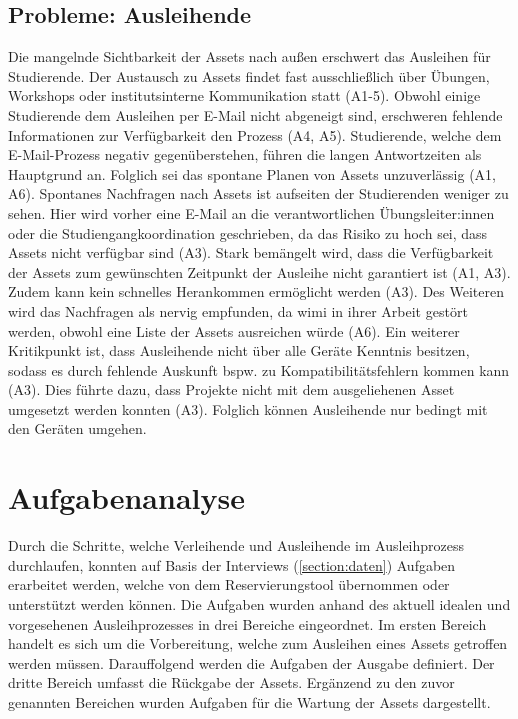 \subsection{Probleme: Ausleihende}
\label{section:probleme-Ausleihende}
Die mangelnde Sichtbarkeit der Assets nach außen erschwert das Ausleihen für
Studierende. Der Austausch zu Assets findet fast ausschließlich über Übungen,
Workshops oder institutsinterne Kommunikation statt (A1-5). Obwohl einige
Studierende dem Ausleihen per E-Mail nicht abgeneigt sind, erschweren fehlende
Informationen zur Verfügbarkeit den Prozess (A4, A5). Studierende, welche dem
E-Mail-Prozess negativ gegenüberstehen, führen die langen Antwortzeiten als
Hauptgrund an. Folglich sei das spontane Planen von Assets unzuverlässig (A1,
A6). Spontanes Nachfragen nach Assets ist aufseiten der Studierenden weniger zu
sehen. Hier wird vorher eine E-Mail an die verantwortlichen Übungsleiter:innen
oder die Studiengangkoordination geschrieben, da das Risiko zu hoch sei, dass
Assets nicht verfügbar sind (A3). Stark bemängelt wird, dass die Verfügbarkeit
der Assets zum gewünschten Zeitpunkt der Ausleihe nicht garantiert ist (A1, A3).
Zudem kann kein schnelles Herankommen ermöglicht werden (A3). Des Weiteren wird
das Nachfragen als nervig empfunden, da \ac{wimi} in ihrer Arbeit gestört
werden, obwohl eine Liste der Assets ausreichen würde (A6). Ein weiterer
Kritikpunkt ist, dass Ausleihende nicht über alle Geräte Kenntnis besitzen,
sodass es durch fehlende Auskunft bspw. zu Kompatibilitätsfehlern kommen kann
(A3). Dies führte dazu, dass Projekte nicht mit dem ausgeliehenen Asset
umgesetzt werden konnten (A3). Folglich können Ausleihende nur bedingt mit den
Geräten umgehen.


\section{Aufgabenanalyse}
\label{section:aufgaben}
Durch die Schritte, welche Verleihende und Ausleihende im Ausleihprozess
durchlaufen, konnten auf Basis der Interviews (\ref{section:daten})
Aufgaben erarbeitet werden, welche von dem Reservierungstool übernommen oder
unterstützt werden können. Die Aufgaben wurden anhand des aktuell idealen und
vorgesehenen Ausleihprozesses in drei Bereiche eingeordnet. Im ersten Bereich
handelt es sich um die Vorbereitung, welche zum Ausleihen eines Assets getroffen
werden müssen. Darauffolgend werden die Aufgaben der Ausgabe definiert. Der
dritte Bereich umfasst die Rückgabe der Assets. Ergänzend zu den zuvor genannten
Bereichen wurden Aufgaben für die Wartung der Assets dargestellt.

